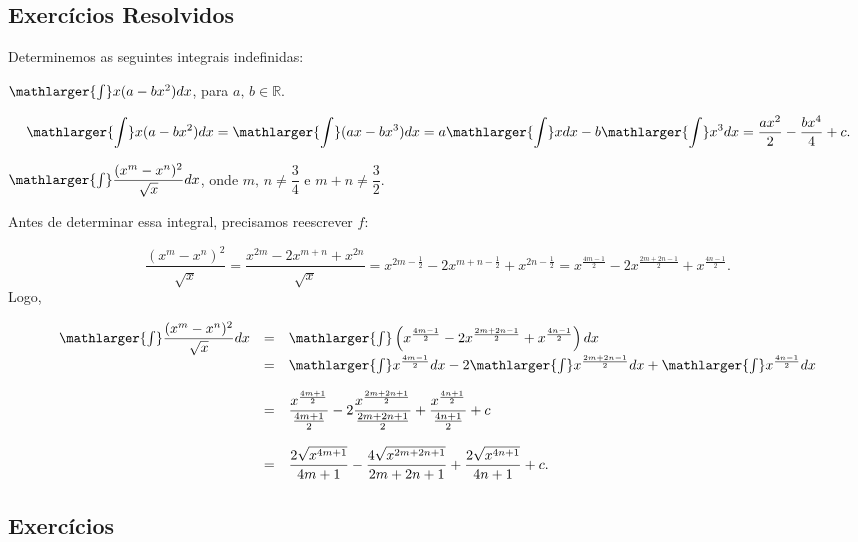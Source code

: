 \cleardoublepage\documentclass[../main.tex]{subfiles}
\begin{document}
\subsection{Exercícios Resolvidos}
\begin{exeresol}
  Determinemos as seguintes integrais indefinidas:
  \begin{compactenum}[a)]
  \item \(\mathlarger{\int} x(a-bx^2)dx\), para \(a,\,b\in \mathbb{R}\).
  
  \begin{solution}
  \[ \mathlarger{\int} x(a-bx^2)dx= \mathlarger{\int} (ax-bx^3)dx= a\mathlarger{\int} x dx -b \mathlarger{\int}x^3 dx= \dfrac{ax^2}{2} - \dfrac{bx^4}{4}+c. \]
  \end{solution}
  \item \(\mathlarger{\int} \dfrac{(x^m -x^n)^2}{\sqrt{x}}dx\), onde \(m,\,n\neq \dfrac{3}{4}\) e \(m+n\neq \dfrac{3}{2}\).
  
  \begin{solution}
  Antes de determinar essa integral, precisamos reescrever \(f\):

\[ \dfrac{(x^m -x^n)^2}{\sqrt{x}}=\dfrac{x^{2m}-2x^{m+n} +x^{2n}}{\sqrt{x}} = x^{2m-\frac{1}{2}}-2x^{m+n-\frac{1}{2}} + x^{2n-\frac{1}{2}}= x^{\frac{4m-1}{2}}-2x^{\frac{2m+2n-1}{2}}+x^{\frac{4n-1}{2}}. \]
Logo,

\[ \begin{array}{rcl} \mathlarger{\int} \dfrac{(x^m -x^n)^2}{\sqrt{x}}dx &=& \mathlarger{\int} \left(x^{\frac{4m-1}{2}}-2x^{\frac{2m+2n-1}{2}}+x^{\frac{4n-1}{2}}\right)dx\\ &=& \mathlarger{\int} x^{\frac{4m-1}{2}} dx -2 \mathlarger{\int} x^{\frac{2m+2n-1}{2}}dx + \mathlarger{\int}x^{\frac{4n-1}{2}}dx\\ \\ &=& \dfrac{x^{\frac{4m+1}{2}}}{\frac{4m+1}{2}} - 2\dfrac{x^{\frac{2m+2n+1}{2}}}{\frac{2m+2n+1}{2}} + \dfrac{x^{\frac{4n+1}{2}}}{\frac{4n+1}{2}} + c\\ \\ &=& \dfrac{2\sqrt{x^{4m+1}}}{4m+1} - \dfrac{4\sqrt{x^{2m+2n+1}}}{2m+2n+1} + \dfrac{2\sqrt{x^{4n+1}}}{4n+1} + c. \end{array} \]
  \end{solution}
  \end{compactenum}
  
\end{exeresol}
\subsection{Exercícios}
\end{document}
